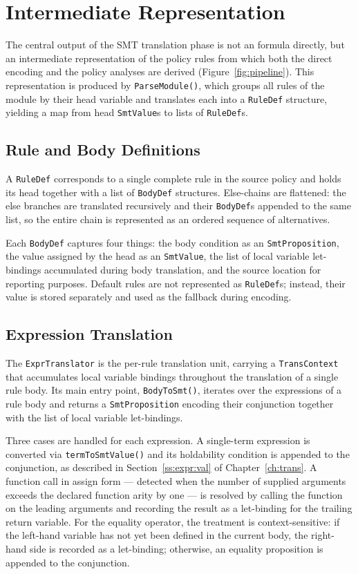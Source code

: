 \section{Intermediate Representation}
\label{s:ir}

The central output of the SMT translation phase is not an \smtlib{} formula directly,
but an intermediate representation of the policy rules from which both the direct
encoding and the policy analyses are derived (Figure~\ref{fig:pipeline}).
This representation is produced by \texttt{ParseModule()}, which groups all rules of the
module by their head variable and translates each into a \texttt{RuleDef} structure,
yielding a map from head \texttt{SmtValue}s to lists of \texttt{RuleDef}s.

\subsection{Rule and Body Definitions}
\label{ss:ir:repr}

A \texttt{RuleDef} corresponds to a single complete rule in the source policy and holds
its head together with a list of \texttt{BodyDef} structures.
Else-chains are flattened: the else branches are translated recursively and their
\texttt{BodyDef}s appended to the same list, so the entire chain is represented as an
ordered sequence of alternatives.

Each \texttt{BodyDef} captures four things: the body condition as an \texttt{SmtProposition},
the value assigned by the head as an \texttt{SmtValue}, the list of local variable
let-bindings accumulated during body translation, and the source location for
reporting purposes.
Default rules are not represented as \texttt{RuleDef}s; instead, their value is stored
separately and used as the fallback during encoding.

\subsection{Expression Translation}
\label{ss:ir:expr}

The \texttt{ExprTranslator} is the per-rule translation unit, carrying a
\texttt{TransContext} that accumulates local variable bindings throughout the translation
of a single rule body.
Its main entry point, \texttt{BodyToSmt()}, iterates over the expressions of a rule body
and returns a \texttt{SmtProposition} encoding their conjunction together with the list
of local variable let-bindings.

Three cases are handled for each expression.
A single-term expression is converted via \texttt{termToSmtValue()} and its holdability
condition is appended to the conjunction, as described in Section~\ref{ss:expr:val} of
Chapter~\ref{ch:trans}.
A function call in assign form --- detected when the number of supplied arguments exceeds
the declared function arity by one --- is resolved by calling the function on the leading
arguments and recording the result as a let-binding for the trailing return variable.
For the equality operator, the treatment is context-sensitive: if the left-hand variable
has not yet been defined in the current body, the right-hand side is recorded as a
let-binding; otherwise, an equality proposition is appended to the conjunction.

